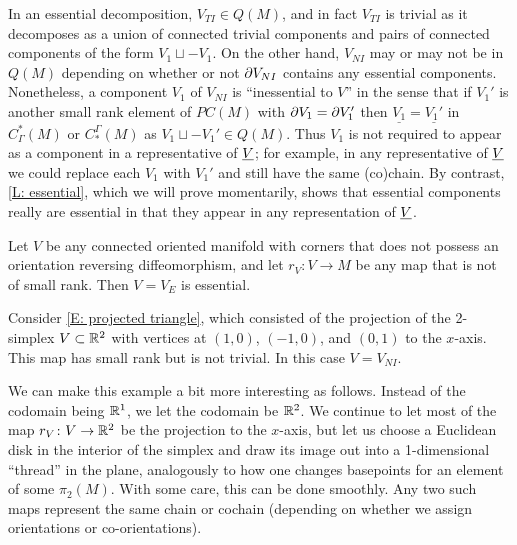 In an essential decomposition, $V_{TI} \in Q(M)$, and in fact $V_{TI}$ is trivial as it decomposes as a union of connected trivial components and pairs of connected components of the form $V_1 \sqcup -V_1$.
On the other hand, $V_{NI}$ may or may not be in $Q(M)$ depending on whether or not $\partial V_{NI}$
contains any essential components.
Nonetheless, a component $V_1$ of $V_{NI}$ is ``inessential to $V$'' in the sense that if $V_1'$ is another small rank element of $PC(M)$ with $\partial V_1 = \partial V_1'$ then $\underline{V_1} = \underline{V_1'}$ in $C_\Gamma^*(M)$ or $C_*^\Gamma(M)$ as $V_1 \sqcup -V_1' \in Q(M)$.
Thus $V_1$ is not required to appear as a component in a representative of $\underline{V}$; for example, in any representative of $\underline{V}$ we could replace each $V_1$ with $V_1'$ and still have the same (co)chain.
By contrast, \cref{L: essential}, which we will prove momentarily, shows that essential components really are essential in that they appear in any representation of $\underline{V}$.

\begin{example}
	Let $V$ be any connected oriented manifold with corners that does not possess an orientation reversing diffeomorphism, and let $r_V \colon V \to M$ be any map that is not of small rank.
	Then $V = V_E$ is essential.
\end{example}

\begin{example}\label{E: bad transversality}
	Consider \cref{E: projected triangle}, which consisted of the projection of the 2-simplex $V \subset \mathbb{R}^2$ with vertices at $(1,0)$, $(-1,0)$, and $(0,1)$ to the $x$-axis.
	This map has small rank but is not trivial.
	In this case $V = V_{NI}$.

	We can make this example a bit more interesting as follows.
	Instead of the codomain being $\mathbb{R}^1$, we let the codomain be $\mathbb{R}^2$.
	We continue to let most of the map $r_V \colon V \to \mathbb{R}^2$ be the projection to the $x$-axis, but let us choose a Euclidean disk in the interior of the simplex and draw its image out into a 1-dimensional ``thread'' in the plane, analogously to how one changes basepoints for an element of some $\pi_2(M)$.
	With some care, this can be done smoothly.
	Any two such maps represent the same chain or cochain (depending on whether we assign orientations or co-orientations).
\end{example}



